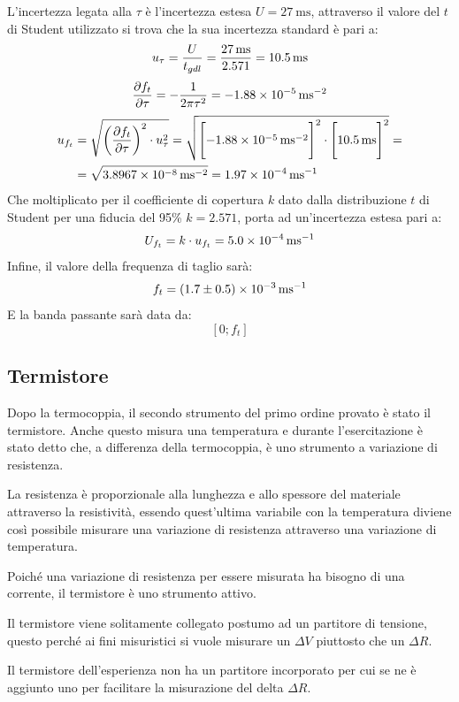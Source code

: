 \documentclass[a4paper, 12pt, twoside]{report}
\begin{document}
\begin{enumerate}
		L'incertezza legata alla $\tau$ è l'incertezza estesa $U = \SI{27}{\milli\second} $, attraverso il valore del $t$ di Student utilizzato si trova che la sua incertezza standard è pari a:
		\[ u_\tau = \dfrac{U}{t_{gdl}} = {\SI{27}{\milli\second}\over2.571} = \SI{10.5}{\milli\second}\]
		\[{\partial f_t\over\partial\tau} = -\dfrac{1}{2\pi\tau^2} = \SI{-1,88d-5}{\per\square\milli\second}\]
		\[ \begin{aligned}
			u_{f_t} & = \sqrt{\left({\partial f_t\over\partial\tau}\right)^2\cdot u_\tau^2 } = \sqrt{ \Biggl[\SI{-1,88d-5}{\per\square\milli\second}\Biggr]^2 \cdot \Biggl[\SI{10.5}{\milli\second}\Biggr]^2} = \\
			& = \sqrt{\SI{3.8967d-8}{\per\square\milli\second}} = \SI{1.97d-4}{\per\milli\second}
		\end{aligned}\]
		Che moltiplicato per il coefficiente di copertura $k$ dato dalla distribuzione $t$ di Student per una fiducia del 95\% $ k=2.571 $, porta ad un'incertezza estesa pari a:
		\[ U_{f_t} = k\cdot u_{f_t} = \SI{5.0d-4}{\per\milli\second}\]
		Infine, il valore della frequenza di taglio sarà:
		\[f_t = \SI[separate-uncertainty = true]{1.7(0.5)d-3}{\per\milli\second}\]
		E la banda passante sarà data da:
		\[ [0; f_t]\]
		\end{enumerate}

\newpage

		\subsection{Termistore}
		Dopo la termocoppia, il secondo strumento del primo ordine provato è stato il termistore. Anche questo misura una temperatura e durante l'esercitazione è stato detto che, a differenza della termocoppia, è uno strumento a variazione di resistenza. 
		
		La resistenza è proporzionale alla lunghezza e allo spessore del materiale attraverso la resistività, essendo quest'ultima variabile con la temperatura diviene così possibile misurare una variazione di resistenza attraverso una variazione di temperatura. 
		
		Poiché una variazione di resistenza per essere misurata ha bisogno di una corrente, il termistore è uno strumento attivo. 
		
		Il termistore viene solitamente collegato postumo ad un partitore di tensione, questo perché ai fini misuristici si vuole misurare un $ \Delta V $ piuttosto che un $ \Delta R $.
		
		Il termistore dell’esperienza non ha un partitore incorporato per cui se ne è aggiunto uno per facilitare la misurazione del delta $ \Delta R $. \newline		
		
\end{document}
